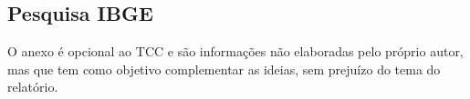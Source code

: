 \documentclass[
	12pt,				%
	openright,			%
	oneside,			%
	a4paper,			%
	chapter=TITLE,		%
	section=TITLE,		%
	english,			%
	french,				%
	spanish,			%
	brazil				%
	]{abntex2}
\begin{document}
\begin{anexosenv}

\chapter{Pesquisa IBGE}
O anexo é opcional ao TCC e são informações não elaboradas pelo próprio autor, mas que tem como objetivo complementar as ideias, sem prejuízo do tema do relatório.

\end{anexosenv}

\label{nropaginas}


\printindex
\end{document}
